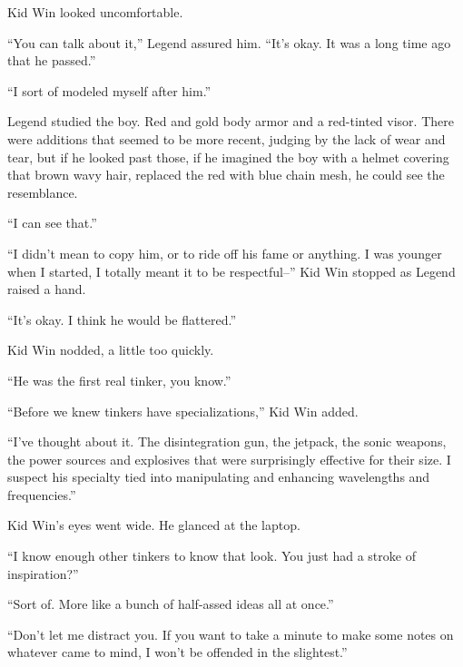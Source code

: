 Kid Win looked uncomfortable.



``You can talk about it,'' Legend assured him.  ``It's okay.  It was a long time ago that he passed.''



``I sort of modeled myself after him.''



Legend studied the boy.  Red and gold body armor and a red-tinted visor.  There were additions that seemed to be more recent, judging by the lack of wear and tear, but if he looked past those, if he imagined the boy with a helmet covering that brown wavy hair, replaced the red with blue chain mesh, he could see the resemblance.



``I can see that.''



``I didn't mean to copy him, or to ride off his fame or anything.  I was younger when I started, I totally meant it to be respectful--''  Kid Win stopped as Legend raised a hand.



``It's okay.  I think he would be flattered.''



Kid Win nodded, a little too quickly.



``He was the first real tinker, you know.''



``Before we knew tinkers have specializations,'' Kid Win added.



``I've thought about it.  The disintegration gun, the jetpack, the sonic weapons, the power sources and explosives that were surprisingly effective for their size.  I suspect his specialty tied into manipulating and enhancing wavelengths and frequencies.''



Kid Win's eyes went wide.  He glanced at the laptop.



``I know enough other tinkers to know that look.  You just had a stroke of inspiration?''



``Sort of.  More like a bunch of half-assed ideas all at once.''



``Don't let me distract you.  If you want to take a minute to make some notes on whatever came to mind, I won't be offended in the slightest.''




